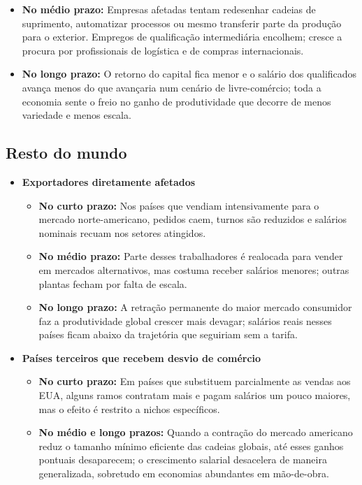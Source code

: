 \documentclass[a4paper,12pt]{article}[abntex2]
\begin{document}
\begin{itemize}
\begin{itemize}
    \item \textbf{No médio prazo:} Empresas afetadas tentam redesenhar cadeias de suprimento, automatizar processos ou mesmo transferir parte da produção para o exterior. Empregos de qualificação intermediária encolhem; cresce a procura por profissionais de logística e de compras internacionais.
    
    \item \textbf{No longo prazo:} O retorno do capital fica menor e o salário dos qualificados avança menos do que avançaria num cenário de livre-comércio; toda a economia sente o freio no ganho de produtividade que decorre de menos variedade e menos escala.
  \end{itemize}
\end{itemize}

\subsection*{\textbf{Resto do mundo}}

\begin{itemize}
  \item \textbf{Exportadores diretamente afetados} 
  \begin{itemize}
    \item \textbf{No curto prazo:} Nos países que vendiam intensivamente para o mercado norte-americano, pedidos caem, turnos são reduzidos e salários nominais recuam nos setores atingidos.
    
    \item \textbf{No médio prazo:} Parte desses trabalhadores é realocada para vender em mercados alternativos, mas costuma receber salários menores; outras plantas fecham por falta de escala.
    
    \item \textbf{No longo prazo:} A retração permanente do maior mercado consumidor faz a produtividade global crescer mais devagar; salários reais nesses países ficam abaixo da trajetória que seguiriam sem a tarifa.
  \end{itemize}
  
  \item \textbf{Países terceiros que recebem desvio de comércio} 
  \begin{itemize}
    \item \textbf{No curto prazo:} Em países que substituem parcialmente as vendas aos EUA, alguns ramos contratam mais e pagam salários um pouco maiores, mas o efeito é restrito a nichos específicos.
    
    \item \textbf{No médio e longo prazos:} Quando a contração do mercado americano reduz o tamanho mínimo eficiente das cadeias globais, até esses ganhos pontuais desaparecem; o crescimento salarial desacelera de maneira generalizada, sobretudo em economias abundantes em mão-de-obra.
  \end{itemize}
\end{itemize}
\end{document}
